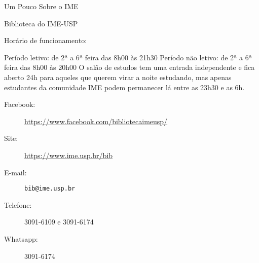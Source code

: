 \begin{secao}{Um Pouco Sobre o IME}
\begin{subsecao}{Biblioteca do IME-USP}
\begin{subsubsecao}{Horário de funcionamento:}

Período letivo: de 2ª a 6ª feira das 8h00 às 21h30 \newline
Período não letivo: de 2ª a 6ª feira das 8h00 às 20h00 \newline
O salão de estudos tem uma entrada independente e fica aberto 24h para aqueles que querem 
virar a noite estudando, mas apenas estudantes da comunidade IME podem permanecer lá entre as 23h30 e as 6h.
\end{subsubsecao}
\begin{description}
  \item[Facebook:] \url{https://www.facebook.com/bibliotecaimeusp/}
  \item[Site:] \url{https://www.ime.usp.br/bib}
  \item[E-mail:] \texttt{bib@ime.usp.br}
  \item[Telefone:] 3091-6109 e 3091-6174
  \item[Whatsapp:] 3091-6174
\end{description}

\end{subsecao}
\end{secao}
